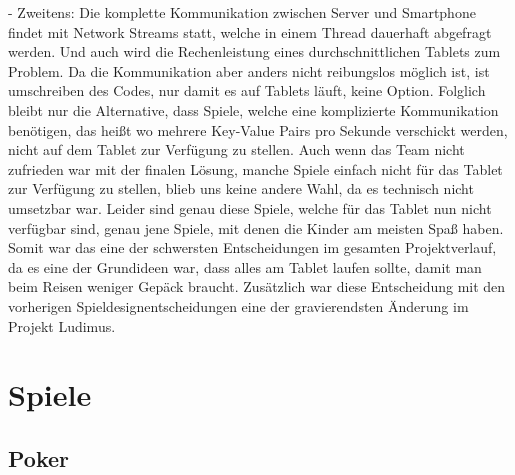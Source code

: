 - Zweitens: Die komplette Kommunikation zwischen Server und Smartphone findet mit Network Streams statt, welche in einem Thread dauerhaft abgefragt werden. Und auch wird die Rechenleistung eines durchschnittlichen Tablets zum Problem. Da die Kommunikation aber anders nicht reibungslos möglich ist, ist umschreiben des Codes, nur damit es auf Tablets läuft, keine Option. Folglich bleibt nur die Alternative, dass Spiele, welche eine komplizierte Kommunikation benötigen, das heißt wo mehrere Key-Value Pairs pro Sekunde verschickt werden, nicht auf dem Tablet zur Verfügung zu stellen.
\newline \newline
Auch wenn das Team nicht zufrieden war mit der finalen Lösung, manche Spiele einfach nicht für das Tablet zur Verfügung zu stellen, blieb uns keine andere Wahl, da es technisch nicht umsetzbar war. Leider sind genau diese Spiele, welche für das Tablet nun nicht verfügbar sind, genau jene Spiele, mit denen die Kinder am meisten Spaß haben. Somit war das eine der schwersten Entscheidungen im gesamten Projektverlauf, da es eine der Grundideen war, dass alles am Tablet laufen sollte, damit man beim Reisen weniger Gepäck braucht. Zusätzlich war diese Entscheidung mit den vorherigen Spieldesignentscheidungen eine der gravierendsten Änderung im Projekt Ludimus.

\section{Spiele}
\subsection{Poker}
